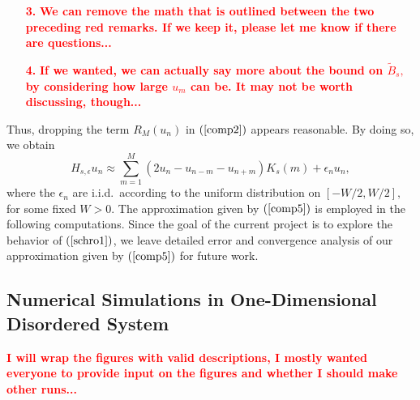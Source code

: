 \documentclass[final,1p,times]{elsarticle}
\newcommand{\bb}[1]{\begin{equation}\label{#1}}
\newcommand{\ee}{\end{equation}}
\newcommand{\no}{\noindent}
\def\R#1{$(\ref{#1})$}
\theoremstyle{remark}
\theoremstyle{definition}
\newcommand{\josh}[1]{\textcolor{red}{\textbf{#1}}}
\begin{document}
\begin{itemize}
\item[\josh{3.}] \josh{We can remove the math that is outlined between the two preceding red remarks. If we keep it, please let me know if there are questions...}

\item[\josh{4.}] \josh{If we wanted, we can actually say more about the bound on $\tilde{B}_s,$ by considering how large $u_m$ can be. It may not be worth discussing, though...} 
\end{itemize}

Thus, dropping the term $R_M(u_n)$ in \R{comp2} appears reasonable. By doing so, we obtain
\bb{comp5}
H_{s,\epsilon}u_n \approx \sum_{m=1}^M (2u_n - u_{n-m}-u_{n+m})K_s(m) + \epsilon_nu_n,
\ee
where the $\epsilon_n$ are i.i.d.~according to the uniform distribution on $[-W/2,W/2],$ for some fixed $W>0.$ The approximation given by \R{comp5} is employed in the following computations. Since the goal of the current project is to explore the behavior of \R{schro1}, we leave detailed error and convergence analysis of our approximation given by \R{comp5} for future work.





\subsection{Numerical Simulations in One-Dimensional Disordered System}

\no\josh{I will wrap the figures with valid descriptions, I mostly wanted everyone to provide input on the figures and whether I should make other runs...}
\end{document}
